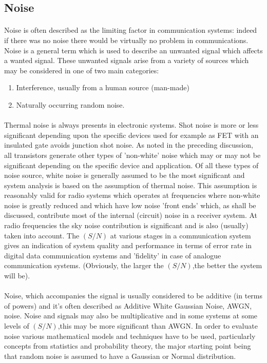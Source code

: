 \documentclass[14pt]{report}
\begin{document}
{\subsection{Noise}
\paragraph{}Noise is often described as the limiting factor in communication systems: indeed if there was no noise there would be virtually no problem in communications. Noise is a general term which is used to describe an unwanted signal which affects a wanted signal. These unwanted signals arise from a variety of sources which may be considered in one of two main categories:\\
\begin{enumerate}
\item 	Interference, usually from a human source (man-made)
\item	Naturally occurring random noise.
\end{enumerate}
\paragraph{}Thermal noise is always presents in electronic systems. Shot noise is more or less significant depending upon the specific devices used for example as FET with an insulated gate avoids junction shot noise. As noted in the preceding discussion, all transistors generate other types of 'non-white' noise which may or may not be significant depending on the specific device and application. Of all these types of noise source, white noise is generally assumed to be the most significant and system analysis is based on the assumption of thermal noise. This assumption is reasonably valid for radio systems which operates at frequencies where non-white noise is greatly reduced and which have low noise 'front ends' which, as shall be discussed, contribute most of the internal (circuit) noise in a receiver system. At radio frequencies the sky noise contribution is significant and is also (usually) taken into account.
The $(S/N)$ at various stages in a communication system gives an indication of  system quality and performance in terms of error rate in digital data  communication systems and 'fidelity'
 in case of analogue communication systems.  (Obviously, the larger the $(S/N)$,the better the system will be).
\paragraph{}Noise, which accompanies the signal is usually considered to be additive (in terms of powers) and it's often described as Additive White Gaussian Noise, AWGN, noise. Noise and signals may also be multiplicative and in some systems at some levels of $(S/N)$,this may be more significant than AWGN.
In order to evaluate noise various mathematical models and techniques have to be used, particularly concepts from statistics and probability theory, the major starting point being that random noise is assumed to have a Gaussian or Normal distribution.
}
\end{document}
